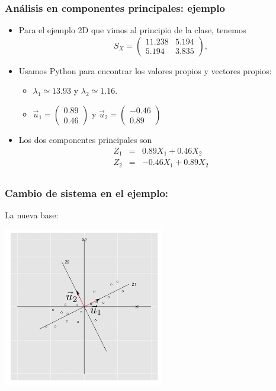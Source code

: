 \documentclass{beamer}
\begin{document}
      \begin{frame}\frametitle{Análisis en componentes principales: ejemplo}
    \begin{itemize}
    \item<+-> Para el ejemplo 2D que vimos al principio de la clase, tenemos 
      $$S_X=\left(\begin{array}{ll}
                    11.238& 5.194\\
                    5.194& 3.835
                  \end{array}\right),$$
    \item<+-> Usamos Python para encontrar los valores propios y vectores propios:
      {\scriptsize\begin{itemize}
      \item<+->       $\lambda_1\simeq 13.93$ y $\lambda_2\simeq 1.16$.
      \item<+-> $\vec{u}_1=\left(\begin{array}{r}0.89\\0.46
    \end{array}
      \right)$ y $\vec{u}_2=\left(\begin{array}{r} -0.46\\0.89\end{array}\right)$
      \end{itemize} }
    \item<+-> Los dos componentes principales son 
\begin{eqnarray*}
Z_1&=&0.89X_1+0.46X_2\\
Z_2&=&-0.46X_1+0.89X_2\\
\end{eqnarray*}
    \end{itemize}
 \end{frame}

  \begin{frame}\frametitle{Cambio de sistema en el ejemplo:}
  La nueva base:
 \begin{center}
   \includegraphics[height=7cm]{x1x2z1z2rotated01-convectores.png}
 \end{center}
  \end{frame}
\end{document}
